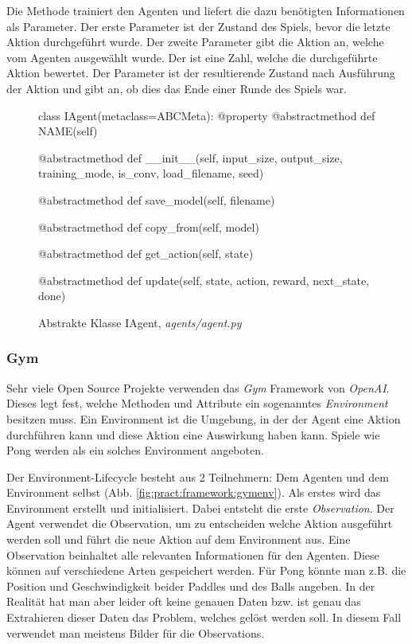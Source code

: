 \documentclass[12pt,a4paper]{article}
\begin{document}
Die Methode  trainiert den Agenten und liefert die dazu benötigten Informationen als Parameter.
Der erste Parameter  ist der Zustand des Spiels, bevor die letzte Aktion durchgeführt wurde.
Der zweite Parameter  gibt die Aktion an, welche vom Agenten ausgewählt wurde.
Der  ist eine Zahl, welche die durchgeführte Aktion bewertet.
Der Parameter  ist der resultierende Zustand nach Ausführung der Aktion und  gibt an, ob dies das Ende einer Runde des Spiels war.

\begin{figure}[!h]
\begin{python}
class IAgent(metaclass=ABCMeta):
	@property
	@abstractmethod
	def NAME(self)

	@abstractmethod
	def __init__(self, input_size, output_size, training_mode, is_conv, load_filename, seed)

	@abstractmethod
	def save_model(self, filename)

	@abstractmethod
	def copy_from(self, model)

	@abstractmethod
	def get_action(self, state)

	@abstractmethod
	def update(self, state, action, reward, next_state, done)
\end{python}
\caption{Abstrakte Klasse IAgent, \textit{agents/agent.py}}
\label{fig:agentpy}
\end{figure}

\subsubsection{Gym}
\label{sec:pract:framework:gym}
Sehr viele Open Source Projekte verwenden das \textit{Gym} Framework von \textit{OpenAI}.
Dieses legt fest, welche Methoden und Attribute ein sogenanntes \textit{Environment} besitzen muss.
Ein Environment ist die Umgebung, in der der Agent eine Aktion durchführen kann und diese Aktion eine Auswirkung haben kann.
Spiele wie Pong werden als ein solches Environment angeboten.

Der Environment-Lifecycle besteht aus 2 Teilnehmern: Dem Agenten und dem Environment selbst (Abb. \ref{fig:pract:framework:gymenv}).
Als erstes wird das Environment erstellt und initialisiert.
Dabei entsteht die erste \textit{Observation}.
Der Agent verwendet die Observation, um zu entscheiden welche Aktion ausgeführt werden soll und führt die neue Aktion auf dem Environment aus.
Eine Observation beinhaltet alle relevanten Informationen für den Agenten.
Diese können auf verschiedene Arten gespeichert werden.
Für Pong könnte man z.B. die Position und Geschwindigkeit beider Paddles und des Balls angeben.
In der Realität hat man aber leider oft keine genauen Daten bzw. ist genau das Extrahieren dieser Daten das Problem, welches gelöst werden soll.
In diesem Fall verwendet man meistens Bilder für die Observations.
\end{document}
